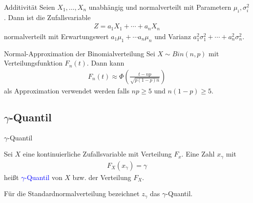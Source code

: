 \documentclass{beamer}
\def\padding{\vspace{0.5cm}}
\def\b{\textcolor{blue}}
\begin{document}
\begin{frame}
    \begin{block}{Additivität}
        Seien $X_1, \dots, X_n$ unabhängig und normalverteilt mit Parametern $\mu_i, \sigma_i^2$. Dann ist die Zufallsvariable
        \begin{align*}
            Z = a_1 X_1 + \cdots + a_n X_n
        \end{align*}
        normalverteilt mit Erwartungswert $a_1 \mu_1 + \cdots a_n \mu_n$ und Varianz $a_1^2 \sigma_1^2 + \cdots + a_n^2 \sigma_n^2$.
    \end{block}\pause\par\padding
    \begin{block}{Normal-Approximation der Binomialverteilung}
        Sei $X \sim Bin(n,p)$ mit Verteilungsfunktion $F_n(t)$. Dann kann
        \begin{align*}
            F_n(t) \approx \Phi\left(\frac{t - n p}{\sqrt{p (1 - p) n}}\right)
        \end{align*}
        als Approximation verwendet werden falls $n p \geq 5$ und $n (1 - p) \geq 5$.
    \end{block}
\end{frame}

\subsection{$\gamma$-Quantil}
\begin{frame}{$\gamma$-Quantil}
    \begin{definition}
        Sei $X$ eine kontinuierliche Zufallsvariable mit Verteilung $F_x$. Eine Zahl $x_{\gamma}$ mit
        \begin{align*}
            F_X(x_{\gamma}) = \gamma
        \end{align*}
        heißt \b{$\gamma$-Quantil} von $X$ bzw. der Verteilung $F_X$.
    \end{definition}\pause\par\padding
    \begin{definition}
        Für die Standardnormalverteilung bezeichnet $z_{\gamma}$ das $\gamma$-Quantil.
    \end{definition}
\end{frame}
\end{document}
